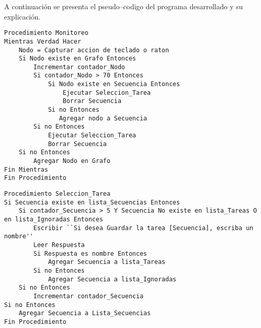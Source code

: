 
A continuaci\'on se presenta el pseudo--codigo del programa desarrollado y su
 explicaci\'on.

\begin{tiny}
\begin{lstlisting}[name=monitor]
Procedimiento Monitoreo
Mientras Verdad Hacer
    Nodo = Capturar accion de teclado o raton
    Si Nodo existe en Grafo Entonces
        Incrementar contador_Nodo
        Si contador_Nodo > 70 Entonces
            Si Nodo existe en Secuencia Entonces
                Ejecutar Seleccion_Tarea
                Borrar Secuencia
            Si no Entonces
               Agregar nodo a Secuencia
        Si no Entonces
            Ejecutar Seleccion_Tarea
            Borrar Secuencia
    Si no Entonces
        Agregar Nodo en Grafo
Fin Mientras
Fin Procedimiento 
\end{lstlisting}
\end{tiny}

\begin{tiny}
\begin{lstlisting}[name=seleccion]
Procedimiento Seleccion_Tarea
Si Secuencia existe en lista_Secuencias Entonces
    Si contador_Secuencia > 5 Y Secuencia No existe en lista_Tareas O en lista_Ignoradas Entonces
        Escribir ``Si desea Guardar la tarea [Secuencia], escriba un nombre''
        Leer Respuesta
        Si Respuesta es nombre Entonces
            Agregar Secuencia a lista_Tareas
        Si no Entonces 
            Agregar Secuencia a lista_Ignoradas
    Si no Entonces
        Incrementar contador_Secuencia
Si no Entonces
    Agregar Secuencia a Lista_Secuencias
Fin Procedimiento
\end{lstlisting}
\end{tiny}
